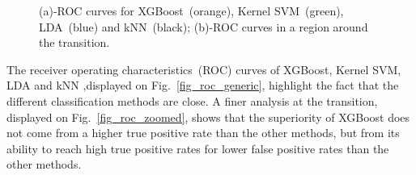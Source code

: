 \begin{figure}[htb]
	\hfill%
	\hfill%
	\hfill\null%
	\caption{(a)-ROC curves for XGBoost~(orange), Kernel SVM~(green), LDA~(blue) and kNN~(black); (b)-ROC curves in a region around the transition.}
	\label{fig_tree_feature}
\end{figure}

The receiver operating characteristics~(ROC) curves of XGBoost, Kernel SVM, LDA and kNN ,displayed on Fig.~\ref{fig_roc_generic}, highlight the fact that the different classification methods are close. A finer analysis at the transition, displayed on Fig.~\ref{fig_roc_zoomed}, shows that the superiority of XGBoost does not come from a higher true positive rate than the other methods, but from its ability to reach high true positive rates for lower false positive rates than the other methods.  